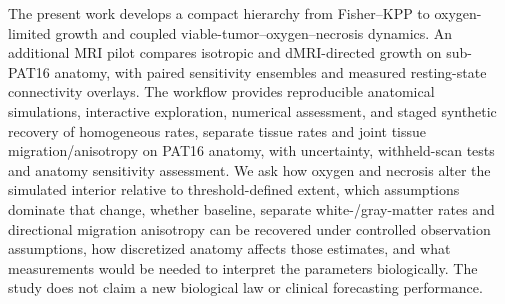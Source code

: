 The present work develops a compact hierarchy from Fisher--KPP to oxygen-limited growth and coupled viable-tumor--oxygen--necrosis dynamics. An additional MRI pilot compares isotropic and dMRI-directed growth on sub-PAT16 anatomy, with paired sensitivity ensembles and measured resting-state connectivity overlays. The workflow provides reproducible anatomical simulations, interactive exploration, numerical assessment, and staged synthetic recovery of homogeneous rates, separate tissue rates and joint tissue migration/anisotropy on PAT16 anatomy, with uncertainty, withheld-scan tests and anatomy sensitivity assessment. We ask how oxygen and necrosis alter the simulated interior relative to threshold-defined extent, which assumptions dominate that change, whether baseline, separate white-/gray-matter rates and directional migration anisotropy can be recovered under controlled observation assumptions, how discretized anatomy affects those estimates, and what measurements would be needed to interpret the parameters biologically. The study does not claim a new biological law or clinical forecasting performance.
